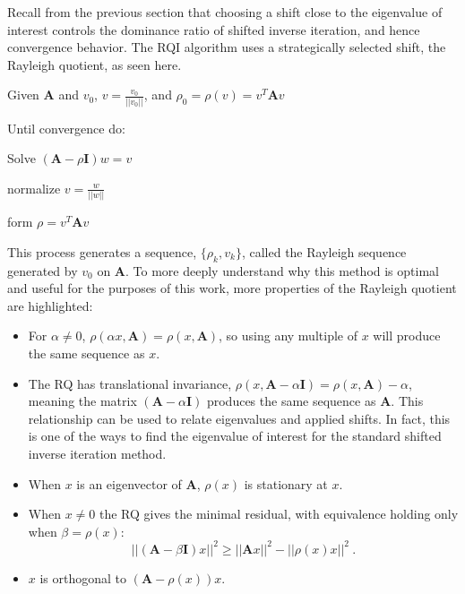 \documentclass[12pt]{article}
\newcommand{\ve}[1]{\ensuremath{\mathbf{#1}}}
\begin{document}
Recall from the previous section that choosing a shift close to the eigenvalue of interest controls the dominance ratio of shifted inverse iteration, and hence convergence behavior. The RQI algorithm uses a strategically selected shift, the Rayleigh quotient, as seen here.%
\begin{list}{}{}
  \item Given $\ve{A}$ and $v_{0}$, $v = \frac{v_{0}}{||v_{0}||}$, and $\rho_{0} = \rho(v) = v^{T}\ve{A}v$ \\
  \item Until convergence do:
  \begin{list}{}{\hspace{2.5em}}
    \item Solve $(\ve{A} - \rho\ve{I})w = v$
    \item normalize $v = \frac{w}{||w||}$
    \item form $\rho = v^{T}\ve{A}v$
  \end{list}
\end{list}
%
This process generates a sequence, $\{\rho_{k}, v_{k}\}$, called the Rayleigh sequence generated by $v_{0}$ on $\ve{A}$. To more deeply understand why this method is optimal and useful for the purposes of this work, more properties of the Rayleigh quotient are highlighted:%
%
\begin{itemize}
  \item For $\alpha \ne 0$, $\rho(\alpha x, \ve{A}) = \rho(x, \ve{A})$, so using any multiple of $x$ will produce the same sequence as $x$. 
  \item The RQ has translational invariance, $\rho(x, \ve{A} - \alpha \ve{I}) = \rho(x,\ve{A}) - \alpha$, meaning the matrix $(\ve{A} - \alpha \ve{I})$ produces the same sequence as $\ve{A}$. %
 This relationship can be used to relate eigenvalues and applied shifts. In fact, this is one of the ways to find the eigenvalue of interest for the standard shifted inverse iteration method.%
\item When $x$ is an eigenvector of $\ve{A}$, $\rho(x)$ is stationary at $x$.  
\item When $x \ne 0$ the RQ gives the minimal residual, with equivalence holding only when $\beta = \rho(x)$:
%
\begin{equation}
  ||(\ve{A} - \beta\ve{I})x||^{2} \ge ||\ve{A}x||^{2} - ||\rho(x)x||^{2} \:.
\end{equation}
%
\item $x$ is orthogonal to $(\ve{A} - \rho(x))x$. 
\end{itemize}
\end{document}
